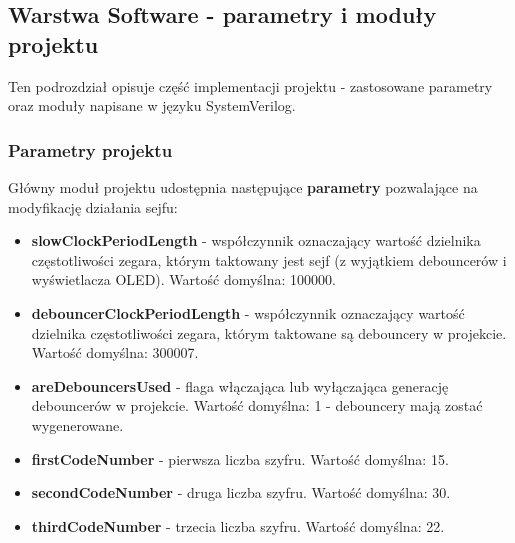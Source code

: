 \documentclass[12pt] {article}
\begin{document}
\subsection{Warstwa Software - parametry i moduły projektu}
Ten podrozdział opisuje część implementacji projektu - zastosowane parametry oraz moduły napisane w języku SystemVerilog.

\subsubsection{Parametry projektu}
Główny moduł projektu udostępnia następujące \textbf{parametry} pozwalające na modyfikację działania sejfu:
\begin{itemize}
\item \textbf{slowClockPeriodLength} - współczynnik oznaczający wartość dzielnika częstotliwości zegara, którym taktowany jest sejf (z wyjątkiem debouncerów i wyświetlacza OLED). Wartość domyślna: 100000.
\item \textbf{debouncerClockPeriodLength} - współczynnik oznaczający wartość dzielnika częstotliwości zegara, którym taktowane są debouncery w projekcie. Wartość domyślna: 300007.
\item \textbf{areDebouncersUsed} - flaga włączająca lub wyłączająca generację debouncerów w projekcie. Wartość domyślna: 1 - debouncery mają zostać wygenerowane.
\item \textbf{firstCodeNumber} - pierwsza liczba szyfru. Wartość domyślna: 15.
\item \textbf{secondCodeNumber} - druga liczba szyfru. Wartość domyślna: 30.
\item \textbf{thirdCodeNumber} - trzecia liczba szyfru. Wartość domyślna: 22.
\end{itemize}
\end{document}
